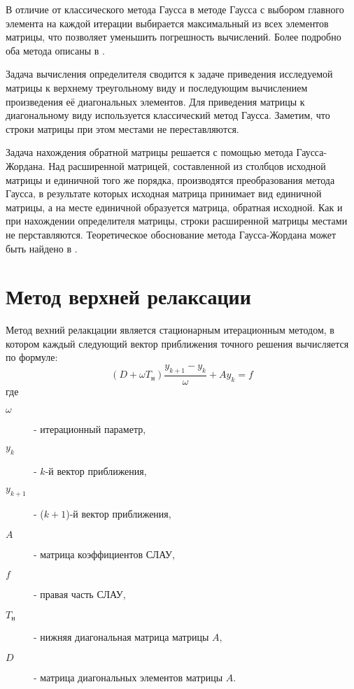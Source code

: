 \documentclass[12pt, a4paper]{report}
\begin{document}
\normalsize{В отличие от классического метода Гаусса в методе Гаусса с выбором главного элемента
            на каждой итерации выбирается максимальный из всех элементов матрицы, что позволяет
            уменьшить погрешность вычислений.
            Более подробно оба метода описаны в \cite{computational_science}.

\normalsize{Задача вычисления определителя сводится к задаче
            приведения исследуемой матрицы к верхнему треугольному виду
            и последующим вычислением произведения её диагональных элементов. 
            Для приведения матрицы к диагональному виду используется классический метод Гаусса. Заметим,
            что строки матрицы при этом местами не переставляются.}

\normalsize{Задача нахождения обратной матрицы решается с помощью метода Гаусса-Жордана. 
            Над расширенной матрицей, составленной из столбцов исходной матрицы и единичной
            того же порядка, производятся преобразования метода Гаусса, в результате которых
            исходная матрица принимает вид единичной матрицы, а на месте единичной образуется
            матрица, обратная исходной. Как и при нахождении определителя матрицы, строки расширенной матрицы
            местами не перставляются. Теоретическое обоснование метода Гаусса-Жордана может быть найдено в \cite{algebra}}.

\section{Метод верхней релаксации}

\normalsize{Метод вехний релакцации является стационарным итерационным методом, 
            в котором каждый следующий вектор приближения точного решения вычисляется по формуле:
            \[ (D + \omega T_н) \frac{y_{k+1} - y_k}{\omega} + A y_k = f \]
            где 
            \begin{description}
                \item[$\omega$] - итерационный параметр, \\
                \item[$y_k$] - $k$-й вектор приближения, \\
                \item[$y_{k+1}$] - ($k+1$)-й вектор приближения, \\
                \item[$A$] - матрица коэффициентов СЛАУ, \\
                \item[$f$] - правая часть СЛАУ, \\
                \item[$T_н$] - нижняя диагональная матрица матрицы $A$, \\
                \item[$D$] - матрица диагональных элементов матрицы $A$. \\
            \end{description}}

}
\end{document}
